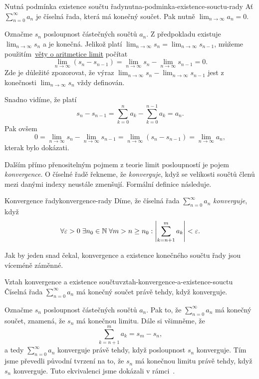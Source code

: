 \begin{lemma}{Nutná podmínka existence součtu
 řady}{nutna-podminka-existence-souctu-rady}
 Ať $\sum_{n=0}^{\infty} a_n$ je číselná řada, která má konečný součet. Pak
 nutně $\lim_{n \to \infty} a_n = 0$.
\end{lemma}
\begin{lemproof}
 Označme $s_n$ posloupnost částečných součtů $a_n$. Z předpokladu existuje
 $\lim_{n \to \infty} s_n$ a je konečná. Jelikož platí $\lim_{n \to \infty} s_n
 = \lim_{n \to \infty} s_{n-1}$, můžeme
 použitím~\hyperref[thm:aritmetika-limit]{věty o aritmetice limit} počítat
 \[
  \lim_{n \to \infty} (s_n - s_{n-1}) = \lim_{n \to \infty} s_n - \lim_{n \to
  \infty} s_{n-1} = 0.
 \]
 Zde je důležité zpozorovat, že výraz $\lim_{n \to \infty} s_n - \lim_{n \to
 \infty} s_{n-1}$ jest z konečnosti $\lim_{n \to \infty} s_n$ vždy definován.

 Snadno vidíme, že platí
 \[
  s_n - s_{n-1} = \sum_{k=0}^n a_k - \sum_{k=0}^{n-1} a_k = a_n.
 \]
 Pak ovšem
 \[
  0 = \lim_{n \to \infty} s_n - \lim_{n \to \infty} s_{n-1} = \lim_{n \to
  \infty} (s_n - s_{n-1}) = \lim_{n \to \infty} a_n,
 \]
 kterak bylo dokázati.
\end{lemproof}

Dalším přímo přenositelným pojmem z teorie limit posloupností je pojem
\emph{konvergence}. O číselné řadě řekneme, že \emph{konverguje}, když se
velikosti součtů členů mezi danými indexy neustále zmenšují. Formální definice
následuje.

\begin{definition}{Konvergence řady}{konvergence-rady}
 Díme, že číselná řada $\sum_{n=0}^{\infty} a_n$ \emph{konverguje}, když
 \[
 \forall \varepsilon > 0 \; \exists n_0 \in \mathbb{N} \; \forall m > n \geq n_0:\left|
 \sum_{k=n+1}^m a_k \right| < \varepsilon.
 \]
\end{definition}

Jak by jeden snad čekal, konvergence a existence konečného součtu řady jsou
víceméně záměnné.

\begin{proposition}{Vztah konvergence a existence
 součtu}{vztah-konvergence-a-existence-souctu}
 Číselná řada $\sum_{n=0}^{\infty} a_n$ má konečný součet právě tehdy, když
 konverguje.
\end{proposition}
\begin{propproof}
 Označme $s_n$ posloupnost částečných součtů $a_n$. Pak to, že
 $\sum_{n=0}^{\infty} a_n$ má konečný součet, znamená, že $s_n$ má konečnou
 limitu. Dále si všimněme, že
 \[
  \sum_{k=n+1}^m a_k = s_m - s_n,
 \]
 a tedy $\sum_{n=0}^{\infty} a_n$ konverguje právě tehdy, když posloupnost $s_n$
 konverguje. Tím jsme převedli původní tvrzení na to, že $s_n$ má konečnou
 limitu právě tehdy, když $s_n$ konverguje. Tuto ekvivalenci jsme dokázali v
 rámci~.
\end{propproof}

